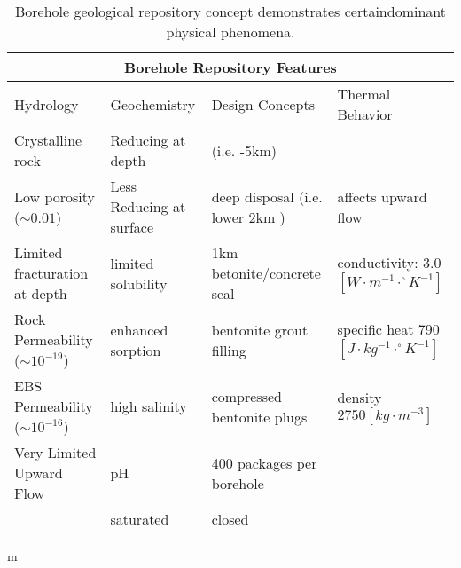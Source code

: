%
\begin{table}[h!]
  \centering
  \footnotesize{
  \begin{tabular}{|l|l|l|l|}
    \multicolumn{4}{c}{\textbf{Borehole Repository Features}}\\
    \hline
    Hydrology & Geochemistry & Design Concepts & Thermal Behavior \\ 
    \hline
    Crystalline rock&Reducing at depth&(i.e. -5km\cite{clayton_generic_2011}) &\\
    Low porosity ($\sim 0.01$)&Less Reducing at surface& deep disposal (i.e.  lower 2km \cite{clayton_generic_2011})&affects upward flow\\
    Limited fracturation at depth&limited solubility &1km betonite/concrete seal &conductivity: 3.0 $[W\cdot m^{-1}\cdot^\circ K^{-1}]$\\
    Rock Permeability ($\sim 10^{-19}$) &enhanced sorption &bentonite grout filling&specific heat 790 $[J\cdot kg^{-1}\cdot^\circ K^{-1}]$\\
    EBS Permeability ($\sim 10^{-16}$) &high salinity&compressed bentonite plugs&density $2750 [kg\cdot m^{-3}]$\\
    Very Limited Upward Flow&pH&400 packages per borehole&\\
    &saturated&closed&\\
    \hline
  \end{tabular}
  \caption[Borehole Repository Features]{Borehole geological repository 
  concept demonstrates certaindominant physical phenomena. }
  \label{tab:borehole_tab}
  }
\end{table}m
